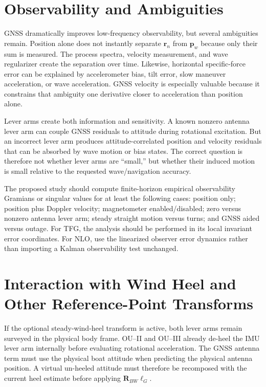 \documentclass[conference]{IEEEtran}
\DeclareRobustCommand{\vct}[1]{\bm{#1}}
\DeclareRobustCommand{\mat}[1]{\bm{#1}}
\begin{document}
\section{Observability and Ambiguities}
\label{sec:observability}

GNSS dramatically improves low-frequency observability, but several ambiguities
remain.  Position alone does not instantly separate $\vct r_n$ from $\vct p_w$ because
only their sum is measured.  The process spectra, velocity measurement, and wave
regularizer create the separation over time.  Likewise, horizontal specific-force
error can be explained by accelerometer bias, tilt error, slow maneuver acceleration,
or wave acceleration.  GNSS velocity is especially valuable because it constrains
that ambiguity one derivative closer to acceleration than position alone.

Lever arms create both information and sensitivity.  A known nonzero antenna lever
arm can couple GNSS residuals to attitude during rotational excitation.  But an
incorrect lever arm produces attitude-correlated position and velocity residuals that
can be absorbed by wave motion or bias states.  The correct question is therefore not
whether lever arms are ``small,'' but whether their induced motion is small relative
to the requested wave/navigation accuracy.

The proposed study should compute finite-horizon empirical observability Gramians or
singular values for at least the following cases: position only; position plus Doppler
velocity; magnetometer enabled/disabled; zero versus nonzero antenna lever arm; steady
straight motion versus turns; and GNSS aided versus outage.  For TFG, the analysis
should be performed in its local invariant error coordinates.  For NLO, use the
linearized observer error dynamics rather than importing a Kalman observability test
unchanged.

\section{Interaction with Wind Heel and Other Reference-Point Transforms}
\label{sec:heel-interaction}

If the optional steady-wind-heel transform is active, both lever arms remain surveyed
in the physical body frame.  OU--II and OU--III already de-heel the IMU lever arm
internally before evaluating rotational acceleration.  The GNSS antenna term must use
the physical boat attitude when predicting the physical antenna position.  A virtual
un-heeled attitude must therefore be recomposed with the current heel estimate before
applying $\mat R_{BW}\vct\ell_G$.
\end{document}
